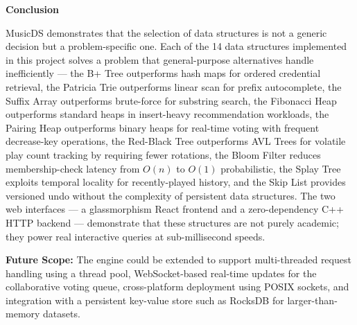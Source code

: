 \documentclass[12pt, a4paper]{article}
\begin{document}

\vspace{0.5cm}

\textbf{Conclusion}

MusicDS demonstrates that the selection of data structures is not a generic decision but a problem-specific one. Each of the 14 data structures implemented in this project solves a problem that general-purpose alternatives handle inefficiently --- the B+ Tree outperforms hash maps for ordered credential retrieval, the Patricia Trie outperforms linear scan for prefix autocomplete, the Suffix Array outperforms brute-force for substring search, the Fibonacci Heap outperforms standard heaps in insert-heavy recommendation workloads, the Pairing Heap outperforms binary heaps for real-time voting with frequent decrease-key operations, the Red-Black Tree outperforms AVL Trees for volatile play count tracking by requiring fewer rotations, the Bloom Filter reduces membership-check latency from $O(n)$ to $O(1)$ probabilistic, the Splay Tree exploits temporal locality for recently-played history, and the Skip List provides versioned undo without the complexity of persistent data structures. The two web interfaces --- a glassmorphism React frontend and a zero-dependency C++ HTTP backend --- demonstrate that these structures are not purely academic; they power real interactive queries at sub-millisecond speeds.

\textbf{Future Scope:} The engine could be extended to support multi-threaded request handling using a thread pool, WebSocket-based real-time updates for the collaborative voting queue, cross-platform deployment using POSIX sockets, and integration with a persistent key-value store such as RocksDB for larger-than-memory datasets.
\end{document}

